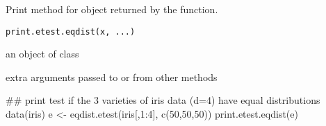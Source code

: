\begin{Description}\relax
Print method for  object returned by the 
 function.
\end{Description}
\begin{Usage}
\begin{verbatim}
print.etest.eqdist(x, ...)
\end{verbatim}
\end{Usage}
\begin{Arguments}
\begin{ldescription}
\item[\code{x}] an object of class  
\item[\code{...}] extra arguments passed to or from other methods 
\end{ldescription}
\end{Arguments}
\begin{SeeAlso}\relax
{}
\end{SeeAlso}
\begin{Examples}
\begin{ExampleCode}
## print test if the 3 varieties of iris data (d=4) have equal distributions
 data(iris)
 e <- eqdist.etest(iris[,1:4], c(50,50,50))
 print.etest.eqdist(e)
 \end{ExampleCode}
\end{Examples}

